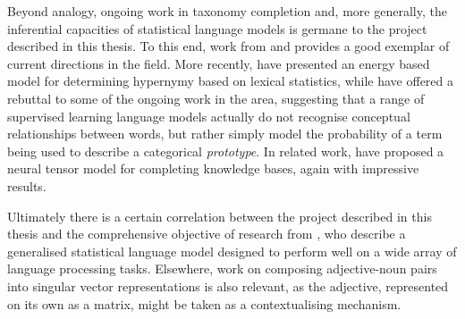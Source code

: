 Beyond analogy, ongoing work in taxonomy completion and, more generally, the inferential capacities of statistical language models is germane to the project described in this thesis.  To this end, work from \cite{CimianoEA2003} and \cite{SnowEA2006} provides a good exemplar of current directions in the field.  More recently, \cite{SantusEA2014} have presented an energy based model for determining hypernymy based on lexical statistics, while \cite{LevyEA2015} have offered a rebuttal to some of the ongoing work in the area, suggesting that a range of supervised learning language models actually do not recognise conceptual relationships between words, but rather simply model the probability of a term being used to describe a categorical \emph{prototype}.  In related work, \cite{SocherEA2013} have proposed a neural tensor model for completing knowledge bases, again with impressive results.

Ultimately there is a certain correlation between the project described in this thesis and the comprehensive objective of research from \cite{BaroniEA2010b}, who describe a generalised statistical language model designed to perform well on a wide array of language processing tasks.  Elsewhere,  work on composing adjective-noun pairs into singular vector representations is also relevant, as the adjective, represented on its own as a matrix, might be taken as a contextualising mechanism.
